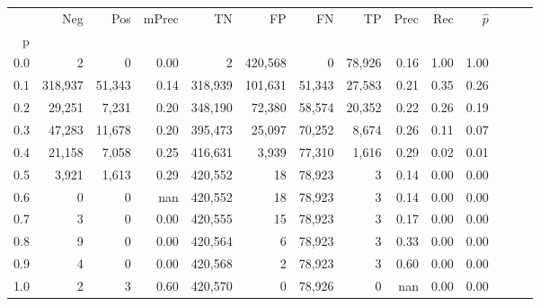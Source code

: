 \begin{tabular}{rrrrrrrrrrrrrr}
\toprule
{} &      Neg &     Pos & mPrec &       TN &       FP &      FN &      TP &  Prec &   Rec & $\hat{p}$ \\
p   &          &         &       &          &          &         &         &       &       &           \\
\midrule
0.0 &        2 &       0 &  0.00 &        2 &  420,568 &       0 &  78,926 &  0.16 &  1.00 &      1.00 \\
0.1 &  318,937 &  51,343 &  0.14 &  318,939 &  101,631 &  51,343 &  27,583 &  0.21 &  0.35 &      0.26 \\
0.2 &   29,251 &   7,231 &  0.20 &  348,190 &   72,380 &  58,574 &  20,352 &  0.22 &  0.26 &      0.19 \\
0.3 &   47,283 &  11,678 &  0.20 &  395,473 &   25,097 &  70,252 &   8,674 &  0.26 &  0.11 &      0.07 \\
0.4 &   21,158 &   7,058 &  0.25 &  416,631 &    3,939 &  77,310 &   1,616 &  0.29 &  0.02 &      0.01 \\
0.5 &    3,921 &   1,613 &  0.29 &  420,552 &       18 &  78,923 &       3 &  0.14 &  0.00 &      0.00 \\
0.6 &        0 &       0 &   nan &  420,552 &       18 &  78,923 &       3 &  0.14 &  0.00 &      0.00 \\
0.7 &        3 &       0 &  0.00 &  420,555 &       15 &  78,923 &       3 &  0.17 &  0.00 &      0.00 \\
0.8 &        9 &       0 &  0.00 &  420,564 &        6 &  78,923 &       3 &  0.33 &  0.00 &      0.00 \\
0.9 &        4 &       0 &  0.00 &  420,568 &        2 &  78,923 &       3 &  0.60 &  0.00 &      0.00 \\
1.0 &        2 &       3 &  0.60 &  420,570 &        0 &  78,926 &       0 &   nan &  0.00 &      0.00 \\
\bottomrule
\end{tabular}
